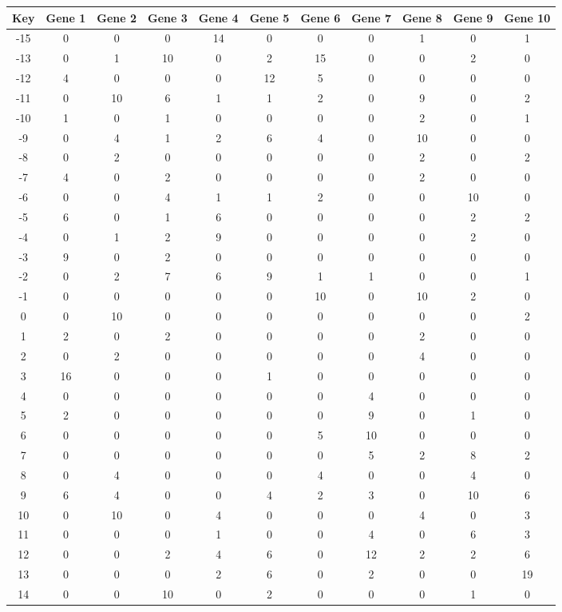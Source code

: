 \begin{tabular}{|c|c|c|c|c|c|c|c|c|c|c|}
\hline
Key & Gene 1 & Gene 2 & Gene 3 & Gene 4 & Gene 5 & Gene 6 & Gene 7 & Gene 8 & Gene 9 & Gene 10 \\
\hline
-15 & 0 & 0 & 0 & 14 & 0 & 0 & 0 & 1 & 0 & 1 \\
-13 & 0 & 1 & 10 & 0 & 2 & 15 & 0 & 0 & 2 & 0 \\
-12 & 4 & 0 & 0 & 0 & 12 & 5 & 0 & 0 & 0 & 0 \\
-11 & 0 & 10 & 6 & 1 & 1 & 2 & 0 & 9 & 0 & 2 \\
-10 & 1 & 0 & 1 & 0 & 0 & 0 & 0 & 2 & 0 & 1 \\
-9 & 0 & 4 & 1 & 2 & 6 & 4 & 0 & 10 & 0 & 0 \\
-8 & 0 & 2 & 0 & 0 & 0 & 0 & 0 & 2 & 0 & 2 \\
-7 & 4 & 0 & 2 & 0 & 0 & 0 & 0 & 2 & 0 & 0 \\
-6 & 0 & 0 & 4 & 1 & 1 & 2 & 0 & 0 & 10 & 0 \\
-5 & 6 & 0 & 1 & 6 & 0 & 0 & 0 & 0 & 2 & 2 \\
-4 & 0 & 1 & 2 & 9 & 0 & 0 & 0 & 0 & 2 & 0 \\
-3 & 9 & 0 & 2 & 0 & 0 & 0 & 0 & 0 & 0 & 0 \\
-2 & 0 & 2 & 7 & 6 & 9 & 1 & 1 & 0 & 0 & 1 \\
-1 & 0 & 0 & 0 & 0 & 0 & 10 & 0 & 10 & 2 & 0 \\
0 & 0 & 10 & 0 & 0 & 0 & 0 & 0 & 0 & 0 & 2 \\
1 & 2 & 0 & 2 & 0 & 0 & 0 & 0 & 2 & 0 & 0 \\
2 & 0 & 2 & 0 & 0 & 0 & 0 & 0 & 4 & 0 & 0 \\
3 & 16 & 0 & 0 & 0 & 1 & 0 & 0 & 0 & 0 & 0 \\
4 & 0 & 0 & 0 & 0 & 0 & 0 & 4 & 0 & 0 & 0 \\
5 & 2 & 0 & 0 & 0 & 0 & 0 & 9 & 0 & 1 & 0 \\
6 & 0 & 0 & 0 & 0 & 0 & 5 & 10 & 0 & 0 & 0 \\
7 & 0 & 0 & 0 & 0 & 0 & 0 & 5 & 2 & 8 & 2 \\
8 & 0 & 4 & 0 & 0 & 0 & 4 & 0 & 0 & 4 & 0 \\
9 & 6 & 4 & 0 & 0 & 4 & 2 & 3 & 0 & 10 & 6 \\
10 & 0 & 10 & 0 & 4 & 0 & 0 & 0 & 4 & 0 & 3 \\
11 & 0 & 0 & 0 & 1 & 0 & 0 & 4 & 0 & 6 & 3 \\
12 & 0 & 0 & 2 & 4 & 6 & 0 & 12 & 2 & 2 & 6 \\
13 & 0 & 0 & 0 & 2 & 6 & 0 & 2 & 0 & 0 & 19 \\
14 & 0 & 0 & 10 & 0 & 2 & 0 & 0 & 0 & 1 & 0 \\
\hline
\end{tabular}